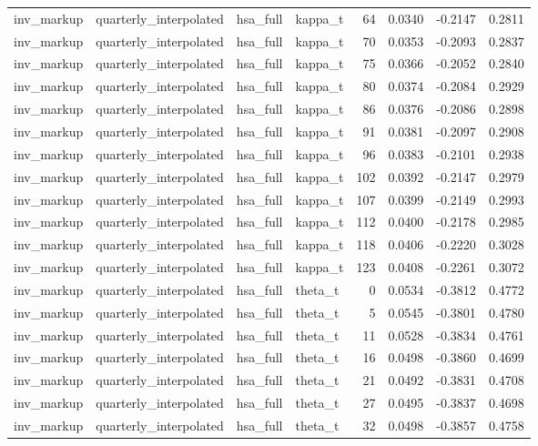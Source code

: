\begin{tabular}{llllrrrr}
inv\_markup & quarterly\_interpolated & hsa\_full & kappa\_t & 64 & 0.0340 & -0.2147 & 0.2811 \\
inv\_markup & quarterly\_interpolated & hsa\_full & kappa\_t & 70 & 0.0353 & -0.2093 & 0.2837 \\
inv\_markup & quarterly\_interpolated & hsa\_full & kappa\_t & 75 & 0.0366 & -0.2052 & 0.2840 \\
inv\_markup & quarterly\_interpolated & hsa\_full & kappa\_t & 80 & 0.0374 & -0.2084 & 0.2929 \\
inv\_markup & quarterly\_interpolated & hsa\_full & kappa\_t & 86 & 0.0376 & -0.2086 & 0.2898 \\
inv\_markup & quarterly\_interpolated & hsa\_full & kappa\_t & 91 & 0.0381 & -0.2097 & 0.2908 \\
inv\_markup & quarterly\_interpolated & hsa\_full & kappa\_t & 96 & 0.0383 & -0.2101 & 0.2938 \\
inv\_markup & quarterly\_interpolated & hsa\_full & kappa\_t & 102 & 0.0392 & -0.2147 & 0.2979 \\
inv\_markup & quarterly\_interpolated & hsa\_full & kappa\_t & 107 & 0.0399 & -0.2149 & 0.2993 \\
inv\_markup & quarterly\_interpolated & hsa\_full & kappa\_t & 112 & 0.0400 & -0.2178 & 0.2985 \\
inv\_markup & quarterly\_interpolated & hsa\_full & kappa\_t & 118 & 0.0406 & -0.2220 & 0.3028 \\
inv\_markup & quarterly\_interpolated & hsa\_full & kappa\_t & 123 & 0.0408 & -0.2261 & 0.3072 \\
inv\_markup & quarterly\_interpolated & hsa\_full & theta\_t & 0 & 0.0534 & -0.3812 & 0.4772 \\
inv\_markup & quarterly\_interpolated & hsa\_full & theta\_t & 5 & 0.0545 & -0.3801 & 0.4780 \\
inv\_markup & quarterly\_interpolated & hsa\_full & theta\_t & 11 & 0.0528 & -0.3834 & 0.4761 \\
inv\_markup & quarterly\_interpolated & hsa\_full & theta\_t & 16 & 0.0498 & -0.3860 & 0.4699 \\
inv\_markup & quarterly\_interpolated & hsa\_full & theta\_t & 21 & 0.0492 & -0.3831 & 0.4708 \\
inv\_markup & quarterly\_interpolated & hsa\_full & theta\_t & 27 & 0.0495 & -0.3837 & 0.4698 \\
inv\_markup & quarterly\_interpolated & hsa\_full & theta\_t & 32 & 0.0498 & -0.3857 & 0.4758 \\

\end{tabular}
